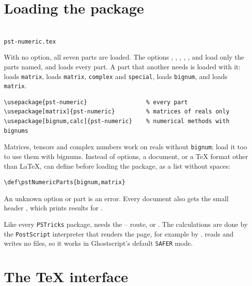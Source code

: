 \documentclass[11pt,english,BCOR=10mm,DIV=12,bibliography=totoc,parskip=false,
   headings=small,headinclude=false,footinclude=false,oneside]{pst-doc}
\DeclareRobustCommand\PS{\texttt{PostScript}\xspace}
\DeclareRobustCommand\PST{\texttt{PSTricks}\xspace}
\newcommand\pkg{\LPack{pst-numeric}}
\begin{document}
\section{Loading the package}

\begin{BDef}
\OptArgs{}\\
 \texttt{pst-numeric.tex}
\end{BDef}

With no option, all seven parts are loaded. The options ,
, , , ,
 and  load only the parts named, and  loads every
part. A part that another needs is loaded with it:  loads
\texttt{matrix},  loads \texttt{matrix}, \texttt{complex} and
\texttt{special},  loads \texttt{bignum}, and
 loads \texttt{matrix}.

\begin{verbatim}
\usepackage{pst-numeric}                 % every part
\usepackage[matrix]{pst-numeric}         % matrices of reals only
\usepackage[bignum,calc]{pst-numeric}    % numerical methods with bignums
\end{verbatim}

Matrices, tensors and complex numbers work on reals without
\texttt{bignum}; load it too to use them with bignums. Instead of options, a
document, or a \TeX{} format other than \LaTeX, can define
 before loading the package, as a list without spaces:

\begin{verbatim}
\def\pstNumericParts{bignum,matrix}

\end{verbatim}

An unknown option or part is an error. Every document also gets the small
header , which prints results for
.

Like every \PST package, \pkg{} needs the --
route, or . The calculations are done by the \PS interpreter
that renders the page, for example by . \pkg{} reads and
writes no files, so it works in Ghostscript's default \texttt{SAFER} mode.


\section{The \TeX{} interface}
\end{document}

